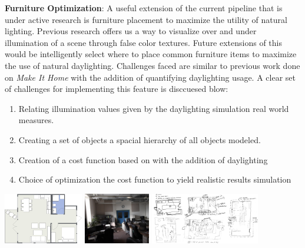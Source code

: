 \documentclass[landscape,final,a0paper,fontscale=0.285]{baposter}
\newcommand{\compresslist}{%
\setlength{\itemsep}{1pt}%
\setlength{\parskip}{0pt}%
\setlength{\parsep}{0pt}%
}
\begin{document}
\begin{poster}
{\begin{multicols}{2}


	\textbf{Furniture Optimization}: A useful extension of the current pipeline that is under active research is furniture placement to maximize the utility of natural lighting. 
	Previous research \cite{NasmanEvaluation} offers us a way to visualize over and under illumination of a scene through false color textures. Future extensions of this would be intelligently select where to place common furniture items to maximize the use of natural daylighting. 
	Challenges faced are similar to previous work done on \emph{Make It Home}\cite{Yu} with the addition of quantifying daylighting usage. A clear set of challenges for implementing this feature is disccuesed blow:
	
	\begin{enumerate}\compresslist
   \item Relating illumination values given by the daylighting simulation real world measures.
   \item Creating a set of objects a spacial hierarchy of all objects modeled.
   \item Creation of a cost function based on\cite{Yu} with the addition of daylighting
   \item Choice of optimization the cost function to yield realistic results simulation
   \end{enumerate}
   
 \end{multicols}
 
 	
 \begin{center}\includegraphics[height=6em]{img/layout.png}	 
 \includegraphics[height=6em]{img/room.jpg}	
 \includegraphics[height=6em]{img/all_together.png}	
  \end{center}
}


\end{poster}
\end{document}
